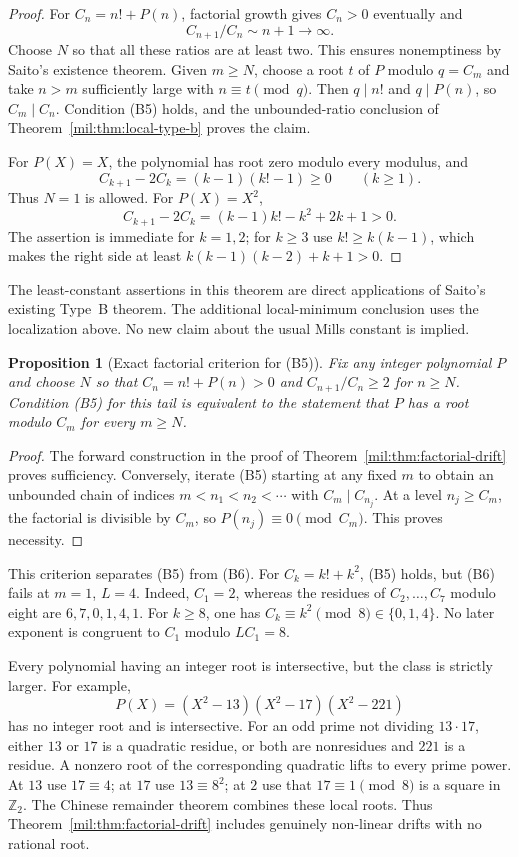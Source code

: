 \documentclass[11pt,a4paper]{article}
\newtheorem{proposition}[theorem]{Proposition}
\theoremstyle{definition}
\theoremstyle{remark}
\numberwithin{equation}{section}
\begin{document}
\begin{proof}
For $C_n=n!+P(n)$, factorial growth gives $C_n>0$ eventually and
\[
 C_{n+1}/C_n\sim n+1\longrightarrow\infty.
\]
Choose $N$ so that all these ratios are at least two. This ensures nonemptiness by Saito's existence theorem. Given $m\geq N$, choose a root $t$ of $P$ modulo $q=C_m$ and take $n>m$ sufficiently large with $n\equiv t\pmod q$. Then $q\mid n!$ and $q\mid P(n)$, so $C_m\mid C_n$. Condition (B5) holds, and the unbounded-ratio conclusion of Theorem~\ref{mil:thm:local-type-b} proves the claim.

For $P(X)=X$, the polynomial has root zero modulo every modulus, and
\[
 C_{k+1}-2C_k=(k-1)(k!-1)\geq0
 \qquad(k\geq1).
\]
Thus $N=1$ is allowed. For $P(X)=X^2$,
\[
 C_{k+1}-2C_k=(k-1)k!-k^2+2k+1>0.
\]
The assertion is immediate for $k=1,2$; for $k\geq3$ use $k!\geq k(k-1)$, which makes the right side at least $k(k-1)(k-2)+k+1>0$.
\end{proof}

The least-constant assertions in this theorem are direct applications of Saito's existing Type~B theorem. The additional local-minimum conclusion uses the localization above. No new claim about the usual Mills constant is implied.

\begin{proposition}[Exact factorial criterion for (B5)]
Fix any integer polynomial $P$ and choose $N$ so that $C_n=n!+P(n)>0$ and $C_{n+1}/C_n\geq2$ for $n\geq N$. Condition (B5) for this tail is equivalent to the statement that $P$ has a root modulo $C_m$ for every $m\geq N$.
\end{proposition}

\begin{proof}
The forward construction in the proof of Theorem~\ref{mil:thm:factorial-drift} proves sufficiency. Conversely, iterate (B5) starting at any fixed $m$ to obtain an unbounded chain of indices $m<n_1<n_2<\cdots$ with $C_m\mid C_{n_j}$. At a level $n_j\geq C_m$, the factorial is divisible by $C_m$, so $P(n_j)\equiv0\pmod{C_m}$. This proves necessity.
\end{proof}

This criterion separates (B5) from (B6). For $C_k=k!+k^2$, (B5) holds, but (B6) fails at $m=1$, $L=4$. Indeed, $C_1=2$, whereas the residues of $C_2,\ldots,C_7$ modulo eight are $6,7,0,1,4,1$. For $k\geq8$, one has $C_k\equiv k^2\pmod8\in\{0,1,4\}$. No later exponent is congruent to $C_1$ modulo $LC_1=8$.

Every polynomial having an integer root is intersective, but the class is strictly larger. For example,
\[
 P(X)=(X^2-13)(X^2-17)(X^2-221)
\]
has no integer root and is intersective. For an odd prime not dividing $13\cdot17$, either $13$ or $17$ is a quadratic residue, or both are nonresidues and $221$ is a residue. A nonzero root of the corresponding quadratic lifts to every prime power. At $13$ use $17\equiv4$; at $17$ use $13\equiv8^2$; at $2$ use that $17\equiv1\pmod8$ is a square in $\mathbb Z_2$. The Chinese remainder theorem combines these local roots. Thus Theorem~\ref{mil:thm:factorial-drift} includes genuinely non-linear drifts with no rational root.
\end{document}
